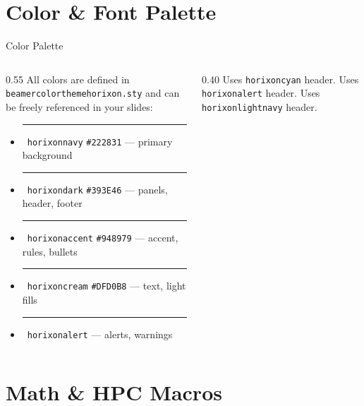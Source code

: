 \documentclass[aspectratio=169]{beamer}
\begin{document}
\section{Color \& Font Palette}

\begin{frame}{Color Palette}
  \begin{columns}[c]
    \begin{column}{0.55\textwidth}
      All colors are defined in \texttt{beamercolorthemehorixon.sty}
      and can be freely referenced in your slides:

      \vspace{0.4em}
      \begin{itemize}
        \item \textcolor{horixonnavy}{\rule{0.8em}{0.8em}}~\texttt{horixonnavy}   \texttt{\#222831} — primary background
        \item \textcolor{horixondark}{\rule{0.8em}{0.8em}}~\texttt{horixondark}   \texttt{\#393E46} — panels, header, footer
        \item \textcolor{horixonaccent}{\rule{0.8em}{0.8em}}~\texttt{horixonaccent} \texttt{\#948979} — accent, rules, bullets
        \item \textcolor{horixoncream}{\rule{0.8em}{0.8em}}~\texttt{horixoncream}  \texttt{\#DFD0B8} — text, light fills
        \item \textcolor{horixonalert}{\rule{0.8em}{0.8em}}~\texttt{horixonalert}  — alerts, warnings
      \end{itemize}
    \end{column}
    \begin{column}{0.40\textwidth}
        Uses \texttt{horixoncyan} header.
      \blockend
        Uses \texttt{horixonalert} header.
      \alertblockend
        Uses \texttt{horixonlightnavy} header.
      \exampleblockend
    \end{column}
  \end{columns}
\end{frame}

\section{Math \& HPC Macros}
\end{document}
